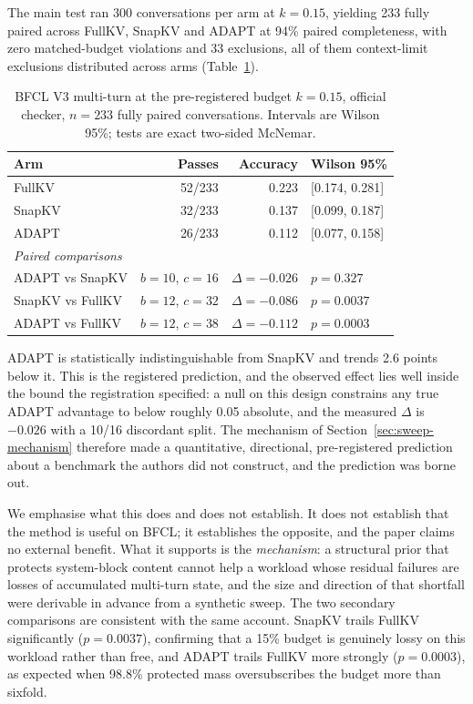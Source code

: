 The main test ran 300 conversations per arm at $k=0.15$, yielding 233 fully
paired across FullKV, SnapKV and ADAPT at 94\% paired completeness, with zero
matched-budget violations and 33 exclusions, all of them context-limit
exclusions distributed across arms (Table~\ref{tab:external-main}).

\begin{table}[!htbp]
  \centering
  \caption{BFCL V3 multi-turn at the pre-registered budget $k=0.15$, official
  checker, $n=233$ fully paired conversations.  Intervals are Wilson 95\%;
  tests are exact two-sided McNemar.}
  \label{tab:external-main}
  \begin{tabular}{lrrl}
    \toprule
    Arm & Passes & Accuracy & Wilson 95\% \\
    \midrule
    FullKV & 52/233 & 0.223 & [0.174, 0.281] \\
    SnapKV & 32/233 & 0.137 & [0.099, 0.187] \\
    ADAPT  & 26/233 & 0.112 & [0.077, 0.158] \\
    \midrule
    \multicolumn{4}{l}{\emph{Paired comparisons}} \\
    ADAPT vs SnapKV & $b{=}10$, $c{=}16$ & $\Delta=-0.026$ & $p=0.327$ \\
    SnapKV vs FullKV & $b{=}12$, $c{=}32$ & $\Delta=-0.086$ & $p=0.0037$ \\
    ADAPT vs FullKV & $b{=}12$, $c{=}38$ & $\Delta=-0.112$ & $p=0.0003$ \\
    \bottomrule
  \end{tabular}
\end{table}

ADAPT is statistically indistinguishable from SnapKV and trends 2.6 points
below it.  This is the registered prediction, and the observed effect lies well
inside the bound the registration specified: a null on this design constrains
any true ADAPT advantage to below roughly 0.05 absolute, and the measured
$\Delta$ is $-0.026$ with a 10/16 discordant split.  The mechanism of
Section~\ref{sec:sweep-mechanism} therefore made a quantitative, directional,
pre-registered prediction about a benchmark the authors did not construct, and
the prediction was borne out.

We emphasise what this does and does not establish.  It does not establish that
the method is useful on BFCL; it establishes the opposite, and the paper claims
no external benefit.  What it supports is the \emph{mechanism}: a structural
prior that protects system-block content cannot help a workload whose residual
failures are losses of accumulated multi-turn state, and the size and direction
of that shortfall were derivable in advance from a synthetic sweep.  The two
secondary comparisons are consistent with the same account.  SnapKV trails
FullKV significantly ($p=0.0037$), confirming that a 15\% budget is genuinely
lossy on this workload rather than free, and ADAPT trails FullKV more strongly
($p=0.0003$), as expected when 98.8\% protected mass oversubscribes the budget
more than sixfold.

